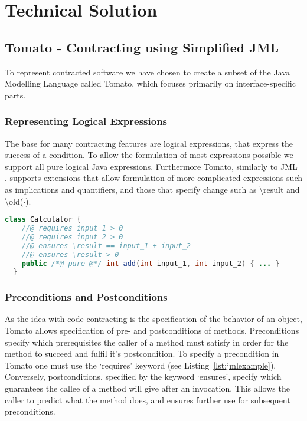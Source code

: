 \section{Technical Solution}
\subsection{Tomato - Contracting using Simplified JML}
\label{sub:Tomato - Contracting using Simplified JML}

To represent contracted software we have chosen to create a subset of the
Java Modelling Language called Tomato,
which focuses primarily on interface-specific parts.

\subsubsection{Representing Logical Expressions}
\label{sub:Representing Logical Expressions}
The base for many contracting features are logical expressions, that express
the success of a condition.
To allow the formulation of most expressions possible we support all pure
logical Java expressions.
Furthermore Tomato, similarly to JML \cite{leavens2006design}.
supports extensions that allow formulation of more complicated
expressions such as implications and quantifiers,
and those that specify change such as \textbackslash result
and \textbackslash old($\cdot$).

\begin{lstlisting}[language=Java,caption={Contracted Method for Adding Natural Numbers},label={lst:jmlexample}]
  class Calculator {
    //@ requires input_1 > 0
    //@ requires input_2 > 0
    //@ ensures \result == input_1 + input_2
    //@ ensures \result > 0
    public /*@ pure @*/ int add(int input_1, int input_2) { ... }
  }
\end{lstlisting}

\subsubsection{Preconditions and Postconditions}
\label{sub:Preconditions and Postconditions}

As the idea with code contracting is the specification of the behavior of
an object, Tomato allows specification of pre- and postconditions of methods.
Preconditions specify which prerequisites the caller of a method must
satisfy in order for the method to succeed and fulfil it's postcondition.
To specify a precondition in Tomato one must use the ‘requires’
keyword (see Listing~\ref{lst:jmlexample}).
Conversely, postconditions, specified by the keyword ‘ensures’,
specify which guarantees the callee of a method will give after an invocation.
This allows the caller to predict what the method does,
and ensures further use for subsequent preconditions.


